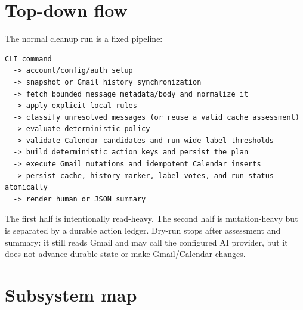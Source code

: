 \documentclass[12pt,oneside]{book}
\begin{document}
\section{Top-down flow}

The normal cleanup run is a fixed pipeline:

\begin{lstlisting}[language={},numbers=none]
CLI command
  -> account/config/auth setup
  -> snapshot or Gmail history synchronization
  -> fetch bounded message metadata/body and normalize it
  -> apply explicit local rules
  -> classify unresolved messages (or reuse a valid cache assessment)
  -> evaluate deterministic policy
  -> validate Calendar candidates and run-wide label thresholds
  -> build deterministic action keys and persist the plan
  -> execute Gmail mutations and idempotent Calendar inserts
  -> persist cache, history marker, label votes, and run status atomically
  -> render human or JSON summary
\end{lstlisting}

The first half is intentionally read-heavy. The second half is mutation-heavy but is separated by a durable action ledger. Dry-run stops after assessment and summary: it still reads Gmail and may call the configured AI provider, but it does not advance durable state or make Gmail/Calendar changes.

\section{Subsystem map}
\end{document}
